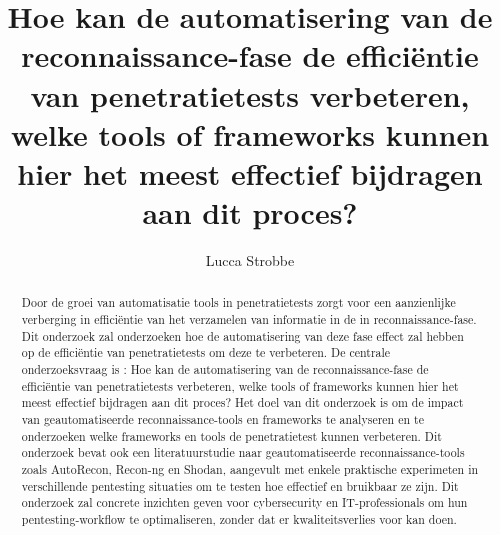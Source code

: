 \documentclass{hogent-article}
\title{Hoe kan de automatisering van de reconnaissance-fase de efficiëntie van penetratietests verbeteren, welke tools of frameworks kunnen hier het meest effectief bijdragen aan dit proces?}
\author{Lucca Strobbe}
\begin{document}
 

\begin{abstract}
  Door de groei van automatisatie tools in penetratietests zorgt voor een aanzienlijke verberging in efficiëntie van het verzamelen
  van informatie in de in reconnaissance-fase. Dit onderzoek zal onderzoeken hoe de automatisering van deze fase effect zal hebben
  op de efficiëntie van penetratietests om deze te verbeteren.  De centrale onderzoeksvraag is : Hoe kan de automatisering van de 
  reconnaissance-fase de efficiëntie van penetratietests verbeteren, welke tools of frameworks kunnen hier het meest effectief 
  bijdragen aan dit proces? Het doel van dit onderzoek is om de impact van geautomatiseerde reconnaissance-tools en frameworks te 
  analyseren en te onderzoeken welke frameworks en tools de penetratietest kunnen verbeteren.  Dit onderzoek bevat ook een 
  literatuurstudie naar geautomatiseerde reconnaissance-tools zoals AutoRecon, Recon-ng en Shodan, aangevult met enkele praktische 
  experimeten in verschillende pentesting situaties om te testen hoe effectief en bruikbaar ze zijn. Dit onderzoek zal concrete 
  inzichten geven voor cybersecurity en IT-professionals om hun pentesting-workflow te optimaliseren, zonder dat er kwaliteitsverlies 
  voor kan doen.
\end{abstract}

\tableofcontents



\printbibliography[heading=bibintoc]
\end{document}
